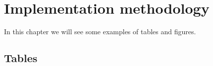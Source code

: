 \chapter{Implementation methodology}
In this chapter we will see some examples of tables and figures.

\section{Tables}
